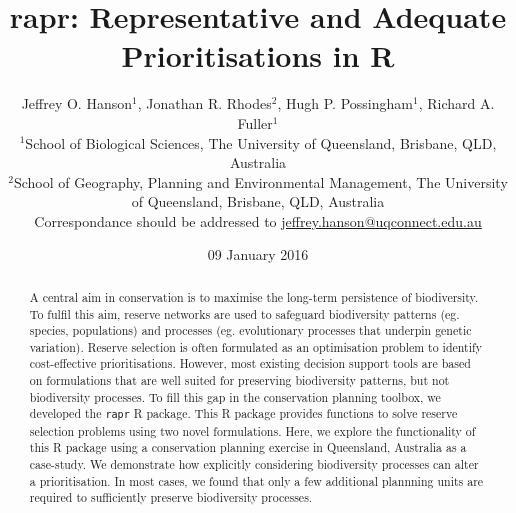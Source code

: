 \documentclass[11pt,]{article}
\title{rapr: Representative and Adequate Prioritisations in R}
\author{Jeffrey O. Hanson$^1$, Jonathan R. Rhodes$^2$, Hugh P. Possingham$^1$,
Richard A. Fuller$^1$\\$^1$School of Biological Sciences, The University
of Queensland, Brisbane, QLD, Australia\\$^2$School of Geography,
Planning and Environmental Management, The University of Queensland,
Brisbane, QLD, Australia\\Correspondance should be addressed to
\href{mailto:jeffrey.hanson@uqconnect.edu.au}{jeffrey.hanson@uqconnect.edu.au}}
\date{09 January 2016}
\begin{document}
\maketitle

\begin{abstract}
A central aim in conservation is to maximise the long-term persistence
of biodiversity. To fulfil this aim, reserve networks are used to
safeguard biodiversity patterns (eg. species, populations) and processes
(eg. evolutionary processes that underpin genetic variation). Reserve
selection is often formulated as an optimisation problem to identify
cost-effective prioritisations. However, most existing decision support
tools are based on formulations that are well suited for preserving
biodiversity patterns, but not biodiversity processes. To fill this gap
in the conservation planning toolbox, we developed the \texttt{rapr} R
package. This R package provides functions to solve reserve selection
problems using two novel formulations. Here, we explore the
functionality of this R package using a conservation planning exercise
in Queensland, Australia as a case-study. We demonstrate how explicitly
considering biodiversity processes can alter a prioritisation. In most
cases, we found that only a few additional plannning units are required
to sufficiently preserve biodiversity processes.
\end{abstract}
\end{document}

